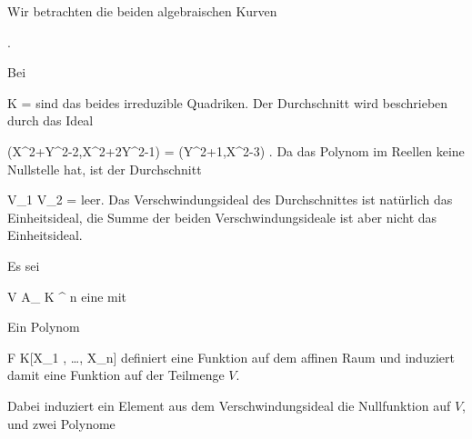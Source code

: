 {





Wir betrachten die beiden algebraischen Kurven

 { . }

Bei

\mavergleichskette
{\vergleichskette
{ K
}
{ = }{ \R
}
{  }{
}
{    }{
}
{   }{
}
}
{}{}{}
sind das beides irreduzible Quadriken. Der Durchschnitt wird beschrieben durch das Ideal

\mavergleichskettedisp
{\vergleichskette
{ (X^2+Y^2-2,X^2+2Y^2-1)
}
{ =} { (Y^2+1,X^2-3)
}
{ } {
}
{ } {
}
{ } {
}
}
{}{}{.}
Da das Polynom
 im Reellen keine Nullstelle hat, ist der Durchschnitt

\mavergleichskette
{\vergleichskette
{ V_1 \cap V_2
}
{ = }{ \emptyset
}
{  }{
}
{    }{
}
{   }{
}
}
{}{}{}
leer. Das Verschwindungsideal des
 {} {}
Durchschnittes ist natürlich das Einheitsideal, die Summe der beiden Verschwindungsideale ist aber nicht das Einheitsideal.





}






Es sei

\mavergleichskette
{\vergleichskette
{ V
}
{ \subseteq }{ { {\mathbb A}_{  K }^{  n   } }
}
{  }{
}
{    }{
}
{   }{
}
}
{}{}{}
eine
mit

 Ein Polynom

\mavergleichskette
{\vergleichskette
{ F
}
{ \in }{ K[X_1 , \ldots ,  X_n]
}
{  }{
}
{    }{
}
{   }{
}
}
{}{}{}
definiert eine Funktion auf dem affinen Raum und induziert damit eine Funktion auf der Teilmenge $V$.

 {  }

Dabei induziert ein Element aus dem Verschwindungsideal
 {} {}
die Nullfunktion auf $V$, und zwei Polynome

